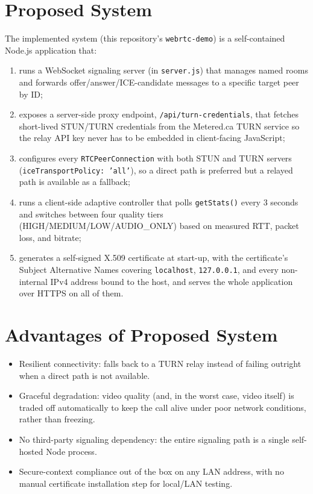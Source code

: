\documentclass[12pt,a4paper]{report}
\begin{document}
\section{Proposed System}
The implemented system (this repository's \texttt{webrtc-demo}) is a self-contained
Node.js application that:
\begin{enumerate}[nosep]
  \item runs a WebSocket signaling server (in \texttt{server.js}) that manages named rooms
  and forwards offer/answer/ICE-candidate messages to a specific target peer by ID;
  \item exposes a server-side proxy endpoint, \texttt{/api/turn-credentials}, that fetches
  short-lived STUN/TURN credentials from the Metered.ca TURN service so the relay API key
  never has to be embedded in client-facing JavaScript;
  \item configures every \texttt{RTCPeerConnection} with both STUN and TURN servers
  (\texttt{iceTransportPolicy: 'all'}), so a direct path is preferred but a relayed path is
  available as a fallback;
  \item runs a client-side adaptive controller that polls \texttt{getStats()} every
  3 seconds and switches between four quality tiers (HIGH/MEDIUM/LOW/AUDIO\_ONLY) based on
  measured RTT, packet loss, and bitrate;
  \item generates a self-signed X.509 certificate at start-up, with the certificate's
  Subject Alternative Names covering \texttt{localhost}, \texttt{127.0.0.1}, and every
  non-internal IPv4 address bound to the host, and serves the whole application over HTTPS
  on all of them.
\end{enumerate}

\section{Advantages of Proposed System}
\begin{itemize}[nosep]
  \item Resilient connectivity: falls back to a TURN relay instead of failing outright when
  a direct path is not available.
  \item Graceful degradation: video quality (and, in the worst case, video itself) is traded
  off automatically to keep the call alive under poor network conditions, rather than
  freezing.
  \item No third-party signaling dependency: the entire signaling path is a single
  self-hosted Node process.
  \item Secure-context compliance out of the box on any LAN address, with no manual
  certificate installation step for local/LAN testing.
\end{itemize}
\end{document}
